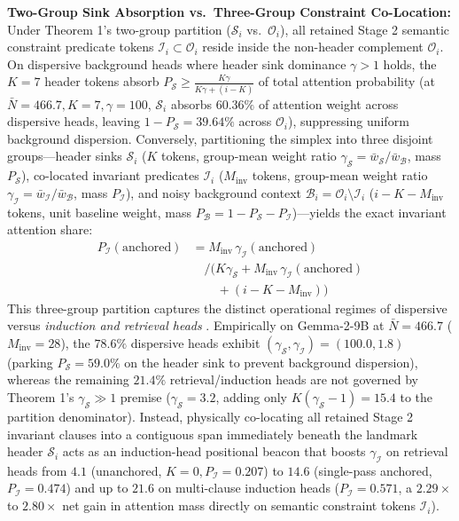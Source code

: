 \documentclass[conference,10pt]{IEEEtran}
\begin{document}
\textbf{Two-Group Sink Absorption vs.\ Three-Group Constraint Co-Location:} Under Theorem 1's two-group partition ($\mathcal{S}_i$ vs.\ $\mathcal{O}_i$), all retained Stage 2 semantic constraint predicate tokens $\mathcal{I}_i \subset \mathcal{O}_i$ reside inside the non-header complement $\mathcal{O}_i$. On dispersive background heads where header sink dominance $\gamma > 1$ holds, the $K=7$ header tokens absorb $P_{\mathcal{S}} \ge \frac{K\gamma}{K\gamma + (i-K)}$ of total attention probability (at $\bar{N}=466.7, K=7, \gamma=100$, $\mathcal{S}_i$ absorbs $60.36\%$ of attention weight across dispersive heads, leaving $1 - P_{\mathcal{S}} = 39.64\%$ across $\mathcal{O}_i$), suppressing uniform background dispersion. Conversely, partitioning the simplex into three disjoint groups---header sinks $\mathcal{S}_i$ ($K$ tokens, group-mean weight ratio $\gamma_{\mathcal{S}} = \bar{w}_{\mathcal{S}}/\bar{w}_{\mathcal{B}}$, mass $P_{\mathcal{S}}$), co-located invariant predicates $\mathcal{I}_i$ ($M_{\text{inv}}$ tokens, group-mean weight ratio $\gamma_{\mathcal{I}} = \bar{w}_{\mathcal{I}}/\bar{w}_{\mathcal{B}}$, mass $P_{\mathcal{I}}$), and noisy background context $\mathcal{B}_i = \mathcal{O}_i \setminus \mathcal{I}_i$ ($i - K - M_{\text{inv}}$ tokens, unit baseline weight, mass $P_{\mathcal{B}} = 1 - P_{\mathcal{S}} - P_{\mathcal{I}}$)---yields the exact invariant attention share:
\begin{equation}
\label{eq:three_group_partition}
\begin{split}
P_{\mathcal{I}}(\text{anchored}) &= M_{\text{inv}}\,\gamma_{\mathcal{I}}(\text{anchored}) \\
&\quad \Big/ \big( K\gamma_{\mathcal{S}} + M_{\text{inv}}\,\gamma_{\mathcal{I}}(\text{anchored}) \\
&\qquad + (i - K - M_{\text{inv}}) \big)
\end{split}
\end{equation}
This three-group partition captures the distinct operational regimes of dispersive versus \textit{induction and retrieval heads} \cite{vaswani2017attention}. Empirically on Gemma-2-9B at $\bar{N}=466.7$ ($M_{\text{inv}}=28$), the $78.6\%$ dispersive heads exhibit $(\gamma_{\mathcal{S}}, \gamma_{\mathcal{I}}) = (100.0, 1.8)$ (parking $P_{\mathcal{S}} = 59.0\%$ on the header sink to prevent background dispersion), whereas the remaining $21.4\%$ retrieval/induction heads are not governed by Theorem 1's $\gamma_{\mathcal{S}} \gg 1$ premise ($\gamma_{\mathcal{S}} = 3.2$, adding only $K(\gamma_{\mathcal{S}} - 1) = 15.4$ to the partition denominator). Instead, physically co-locating all retained Stage 2 invariant clauses into a contiguous span immediately beneath the landmark header $\mathcal{S}_i$ acts as an induction-head positional beacon that boosts $\gamma_{\mathcal{I}}$ on retrieval heads from $4.1$ (unanchored, $K=0, P_{\mathcal{I}} = 0.207$) to $14.6$ (single-pass anchored, $P_{\mathcal{I}} = 0.474$) and up to $21.6$ on multi-clause induction heads ($P_{\mathcal{I}} = 0.571$, a $2.29\times$ to $2.80\times$ net gain in attention mass directly on semantic constraint tokens $\mathcal{I}_i$).
\end{document}
